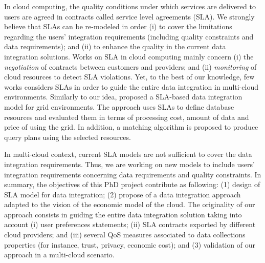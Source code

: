 In cloud computing, the quality conditions under which services are delivered to users are agreed in contracts called service level agreements (SLA). We strongly believe that SLAs can be re-modeled in order (i) to cover the limitations regarding the users' integration requirements (including quality constraints and data requirements); and (ii) to enhance the quality in the current data integration solutions. 
%
Works on SLA in cloud computing mainly concern (i) the \textit{negotiation} of contracts between customers and providers; and (ii) \textit{monitoring} of cloud resources to detect SLA violations.
Yet, to the best of our knowledge, few works considers SLAs in order to guide the entire data integration in multi-cloud environments.
Similarly to our idea, \cite{Nie07} proposed a SLA-based data integration model for grid environments. The approach uses SLAs to define database resources and evaluated them in terms of processing cost, amount of data and price of using the grid. In addition, a matching algorithm is proposed to produce query plans using the selected resources. 


In multi-cloud context, current SLA models are not sufficient to cover the data integration requirements. Thus, we are working on new models to include users' integration requirements concerning data requirements and quality constraints. In summary, the objectives of this PhD project contribute as following: (1) design of SLA model for data integration; (2) propose of a data integration approach adapted to the vision of the economic model of the cloud. The originality of our approach consists in guiding the entire data integration solution taking into account (i) user preferences statements; (ii) SLA contracts exported by different cloud providers; and (iii) several QoS measures associated to data collections properties (for instance, trust, privacy, economic cost); and (3) validation of our approach in a multi-cloud scenario.
